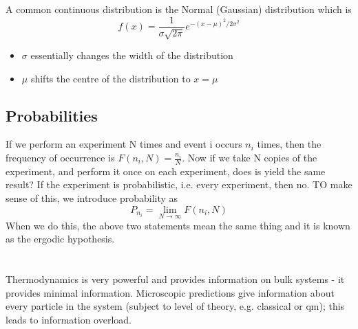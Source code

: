 \documentclass[a4paper, 11pt, normalem]{report}
\begin{document}
A common continuous distribution is the Normal (Gaussian) distribution which is
\begin{equation}
    f(x) = \frac{1}{\sigma\sqrt{2\pi}}e^{-(x-\mu)^2/2\sigma^2}
\end{equation}
\begin{itemize}
    \item $\sigma$ essentially changes the width of the distribution
    \item $\mu$ shifts the centre of the distribution to $x=\mu$
\end{itemize}

\section{Probabilities}
If we perform an experiment N times and event i occurs $n_i$ times, then the frequency of occurrence is $F(n_i, N) = \frac{n_i}{N}$.
Now if we take N copies of the experiment, and perform it once on each experiment, does is yield the same result?
If the experiment is probabilistic, i.e. every experiment, then no.
TO make sense of this, we introduce probability as
\begin{equation}
    P_{n_i} = \lim_{N\to\infty} F(n_i, N)
\end{equation}
When we do this, the above two statements mean the same thing and it is known as the ergodic hypothesis.

\chapter{}
Thermodynamics is very powerful and provides information on bulk systems - it provides minimal information.
Microscopic predictions give information about every particle in the system (subject to level of theory, e.g. classical or qm); this leads to information overload.
\end{document}
